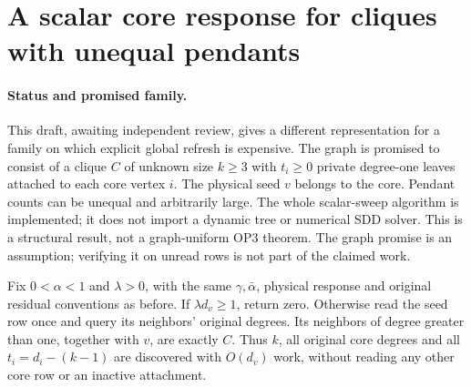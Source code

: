 \section{A scalar core response for cliques with unequal pendants}
\label{sec:op3-local-clique-pendants}

\paragraph{Status and promised family.}
This \statusproved{} draft, awaiting independent review, gives a different
representation for a family on which explicit global refresh is expensive.
The graph is promised to consist of a clique $C$ of unknown size $k\geq3$
with $t_i\geq0$ private degree-one leaves attached to each core vertex $i$.
The physical seed $v$ belongs to the core. Pendant counts can be unequal
and arbitrarily large. The whole scalar-sweep algorithm is implemented;
it does not import a dynamic tree or numerical SDD solver. This is a
structural result, not a graph-uniform OP3 theorem.
The graph promise is an assumption; verifying it on unread rows is not
part of the claimed work.

Fix $0<\alpha<1$ and $\lambda>0$, with the same $\gamma,\bar\alpha$,
physical response and original residual conventions as before.
If $\lambda d_v\geq1$, return zero. Otherwise read the seed row once and
query its neighbors' original degrees. Its neighbors of degree greater
than one, together with $v$, are exactly $C$. Thus $k$, all original core
degrees and all $t_i=d_i-(k-1)$ are discovered with $O(d_v)$ work, without
reading any other core row or an inactive attachment.

